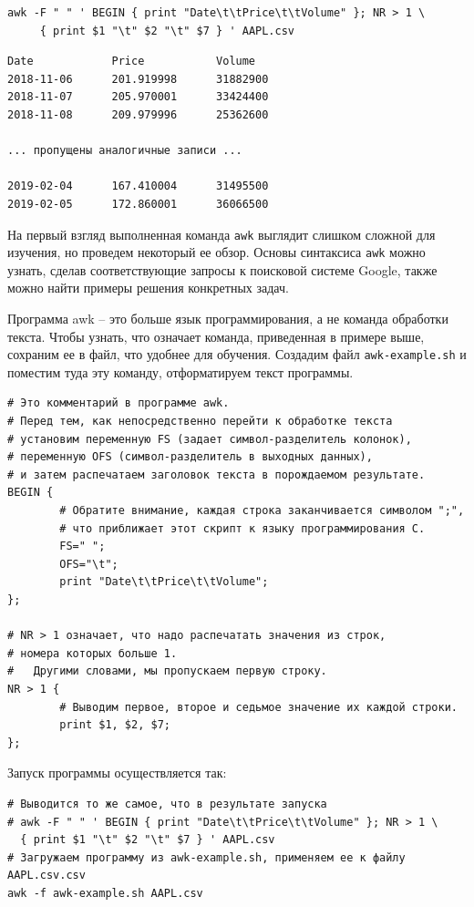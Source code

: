 \documentclass[a4paper,12pt,final,openany]{extbook}
\begin{document}
\begin{verbatim}
awk -F " " ' BEGIN { print "Date\t\tPrice\t\tVolume" }; NR > 1 \
     { print $1 "\t" $2 "\t" $7 } ' AAPL.csv
\end{verbatim}

\begin{verbatim}
Date            Price           Volume
2018-11-06      201.919998      31882900
2018-11-07      205.970001      33424400
2018-11-08      209.979996      25362600

... пропущены аналогичные записи ...

2019-02-04      167.410004      31495500
2019-02-05      172.860001      36066500
\end{verbatim}

На первый взгляд выполненная команда \texttt{awk} выглядит слишком сложной для изучения, но
проведем некоторый ее обзор. Основы синтаксиса \texttt{awk} можно узнать, сделав
соответствующие запросы к поисковой системе Google, также можно найти
примеры решения конкретных задач.

Программа awk -- это больше язык программирования, а не команда обработки
текста. Чтобы узнать, что означает команда, приведенная в примере выше, сохраним ее в
файл, что удобнее для обучения. Создадим файл \texttt{awk-example.sh} и
поместим туда эту команду, отформатируем текст программы.

\begin{verbatim}
# Это комментарий в программе awk.
# Перед тем, как непосредственно перейти к обработке текста
# установим переменную FS (задает символ-разделитель колонок),
# переменную OFS (символ-разделитель в выходных данных),
# и затем распечатаем заголовок текста в порождаемом результате.
BEGIN {
        # Обратите внимание, каждая строка заканчивается символом ";",
        # что приближает этот скрипт к языку программирования C.
        FS=" ";
        OFS="\t";
        print "Date\t\tPrice\t\tVolume";
};

# NR > 1 означает, что надо распечатать значения из строк,
# номера которых больше 1.
#   Другими словами, мы пропускаем первую строку.
NR > 1 {
        # Выводим первое, второе и седьмое значение их каждой строки.
        print $1, $2, $7;
};
\end{verbatim}

Запуск программы осуществляется так:

\begin{verbatim}
# Выводится то же самое, что в результате запуска
# awk -F " " ' BEGIN { print "Date\t\tPrice\t\tVolume" }; NR > 1 \
  { print $1 "\t" $2 "\t" $7 } ' AAPL.csv
# Загружаем программу из awk-example.sh, применяем ее к файлу AAPL.csv.csv
awk -f awk-example.sh AAPL.csv
\end{verbatim}
\end{document}
